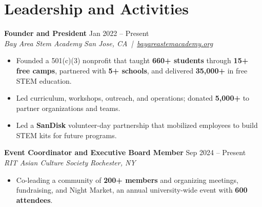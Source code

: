\documentclass[10pt,letterpaper]{article}
\newif\ifresumeFirstRole
\newcommand{\resumeRole}[4]{%
  \ifresumeFirstRole
    \global\resumeFirstRolefalse
  \else
    \vspace{0pt plus 1fill}%
  \fi
  \textbf{#1} \hfill #2\\
  \textit{#3} \hfill \textit{#4}
}
\begin{document}
\section*{Leadership and Activities}
\resumeRole{Founder and President}{Jan 2022 -- Present}{Bay Area Stem Academy}{San Jose, CA \,|\, \href{https://bayareastemacademy.org}{bayareastemacademy.org}}
\begin{itemize}
  \item Founded a 501(c)(3) nonprofit that taught \textbf{660+ students} through \textbf{15+ free camps}, partnered with \textbf{5+ schools}, and delivered \textbf{\textdollar{}35,000+} in free STEM education.
  \item Led curriculum, workshops, outreach, and operations; donated \textbf{\textdollar{}5,000+} to partner organizations and teams.
  \item Led a \textbf{SanDisk} volunteer-day partnership that mobilized employees to build STEM kits for future programs.
\end{itemize}

\resumeRole{Event Coordinator and Executive Board Member}{Sep 2024 -- Present}{RIT Asian Culture Society}{Rochester, NY}
\begin{itemize}
  \item Co-leading a community of \textbf{200+ members} and organizing meetings, fundraising, and Night Market, an annual university-wide event with \textbf{600 attendees}.
\end{itemize}
\end{document}

